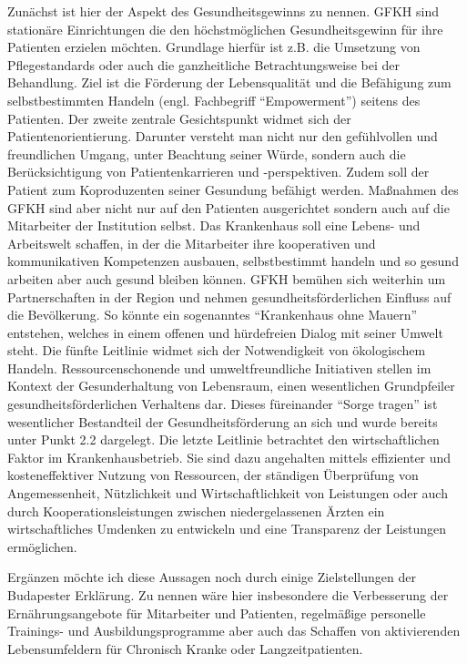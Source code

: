 Zunächst ist hier der Aspekt des Gesundheitsgewinns zu nennen. GFKH sind stationäre Einrichtungen die den höchstmöglichen Gesundheitsgewinn für ihre Patienten erzielen möchten. Grundlage hierfür ist z.B. die Umsetzung von Pflegestandards oder auch die ganzheitliche Betrachtungsweise bei der Behandlung. Ziel ist die Förderung der Lebensqualität und die Befähigung zum selbstbestimmten Handeln (engl. Fachbegriff "`Empowerment"') seitens des Patienten. Der zweite zentrale Gesichtspunkt widmet sich der Patientenorientierung. Darunter versteht man nicht nur den gefühlvollen und freundlichen Umgang, unter Beachtung seiner Würde, sondern auch die Berücksichtigung von Patientenkarrieren und -perspektiven. Zudem soll der Patient zum Koproduzenten seiner Gesundung befähigt werden. Maßnahmen des GFKH sind aber nicht nur auf den Patienten ausgerichtet sondern auch auf die Mitarbeiter der Institution selbst. Das Krankenhaus soll eine Lebens- und Arbeitswelt schaffen, in der die Mitarbeiter ihre kooperativen und kommunikativen Kompetenzen ausbauen, selbstbestimmt handeln und so gesund arbeiten aber auch gesund bleiben können. GFKH bemühen sich weiterhin um Partnerschaften in der Region und nehmen gesundheitsförderlichen Einfluss auf die Bevölkerung. So könnte ein sogenanntes "`Krankenhaus ohne Mauern"' entstehen, welches in einem offenen und hürdefreien Dialog mit seiner Umwelt steht. Die fünfte Leitlinie widmet sich der Notwendigkeit von ökologischem Handeln. Ressourcenschonende und umweltfreundliche Initiativen stellen im Kontext der Gesunderhaltung von Lebensraum, einen wesentlichen Grundpfeiler gesundheitsförderlichen Verhaltens dar. Dieses füreinander "`Sorge tragen"' ist wesentlicher Bestandteil der Gesundheitsförderung an sich und wurde bereits unter Punkt 2.2 dargelegt. Die letzte Leitlinie betrachtet den wirtschaftlichen Faktor im Krankenhausbetrieb. Sie sind dazu angehalten mittels effizienter und kosteneffektiver Nutzung von Ressourcen, der ständigen Überprüfung von Angemessenheit, Nützlichkeit und Wirtschaftlichkeit von Leistungen oder auch durch Kooperationsleistungen zwischen niedergelassenen Ärzten ein wirtschaftliches Umdenken zu entwickeln und eine Transparenz der Leistungen ermöglichen.

Ergänzen möchte ich diese Aussagen noch durch einige Zielstellungen der Budapester Erklärung. Zu nennen wäre hier insbesondere die Verbesserung der Ernährungsangebote für Mitarbeiter und Patienten, regelmäßige personelle Trainings- und Ausbildungsprogramme aber auch das Schaffen von aktivierenden Lebensumfeldern für Chronisch Kranke oder Langzeitpatienten.

